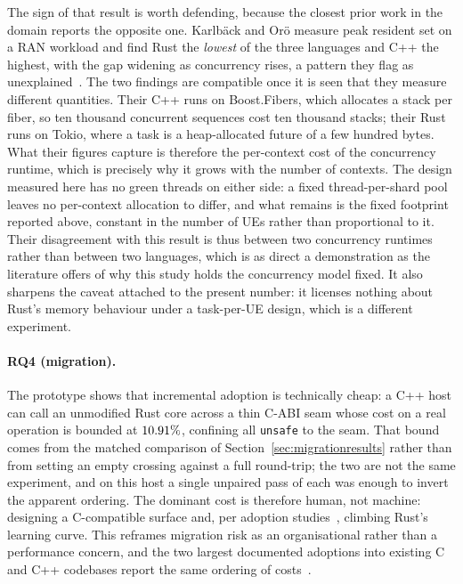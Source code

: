 \documentclass[english,twoside,openright,a4paper,censored,csm,software-track-2020]{HYthesisML}
\begin{document}
The sign of that result is worth defending, because the closest prior work in the domain
reports the opposite one. Karlb\"ack and Or\"o measure peak resident set on a RAN workload and
find Rust the \emph{lowest} of the three languages and C++ the highest, with the gap widening
as concurrency rises, a pattern they flag as unexplained~\cite{karlback2021ran}. The two
findings are compatible once it is seen that they measure different quantities. Their C++ runs
on Boost.Fibers, which allocates a stack per fiber, so ten thousand concurrent sequences cost
ten thousand stacks; their Rust runs on Tokio, where a task is a heap-allocated future of a few
hundred bytes. What their figures capture is therefore the per-context cost of the concurrency
runtime, which is precisely why it grows with the number of contexts. The design measured here
has no green threads on either side: a fixed thread-per-shard pool leaves no per-context
allocation to differ, and what remains is the fixed footprint reported above, constant in the
number of UEs rather than proportional to it. Their disagreement with this result is thus
between two concurrency runtimes rather than between two languages, which is as direct a
demonstration as the literature offers of why this study holds the concurrency model fixed. It
also sharpens the caveat attached to the present number: it licenses nothing about Rust's
memory behaviour under a task-per-UE design, which is a different experiment.

\paragraph{RQ4 (migration).} The prototype shows that incremental adoption is technically
cheap: a C++ host can call an unmodified Rust core across a thin C-ABI seam whose cost on a
real operation is bounded at $10.91\%$, confining all \texttt{unsafe} to the seam.
That bound comes from the matched comparison of Section~\ref{sec:migrationresults} rather than
from setting an empty crossing
against a full round-trip; the two are not the same experiment, and on this host a single
unpaired pass of each was enough to invert the apparent ordering. The dominant cost is
therefore human, not machine: designing a C-compatible surface and, per adoption
studies~\cite{fulton2021adopting,crichton2024learning}, climbing Rust's learning curve. This
reframes migration risk as an organisational rather than a performance concern, and the two
largest documented adoptions into existing C and C++ codebases report the same ordering of
costs~\cite{li2024rustforlinux,fan2026android}.
\end{document}

